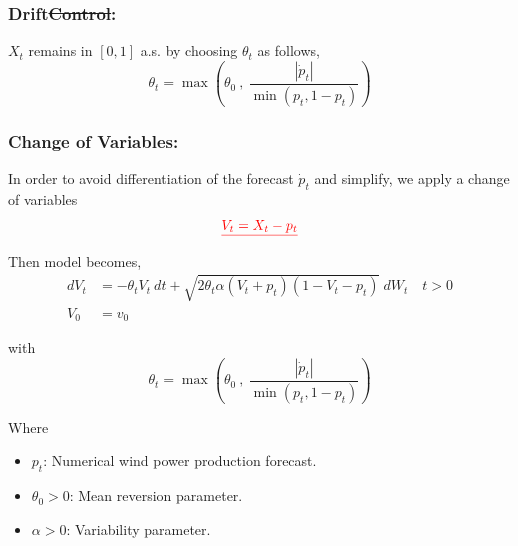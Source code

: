 \documentclass[ima, 20pt, portrait, plainboxedsections]{sciposter}
\providecommand{\DIFadd}[1]{{\protect\color{blue}\uwave{#1}}} %
\providecommand{\DIFdel}[1]{{\protect\color{red}\sout{#1}}}                      %
\providecommand{\DIFaddbegin}{} %
\providecommand{\DIFaddend}{} %
\providecommand{\DIFdelbegin}{} %
\providecommand{\DIFdelend}{} %
\begin{document}
\begin{multicols}{3}
\subsubsection*{Drift\DIFdelbegin \DIFdel{Control}\DIFdelend : }
$X_t$ remains in $[0,1]$ a.s. by choosing $\theta_t$ as follows,
\begin{equation}
\theta_t = \max \left( \theta_0 \ , \ \frac{|\dot{p}_t|}{\min (p_t, 1-p_t)}  \right )
\end{equation}

\subsubsection*{Change of Variables:}
In order to avoid differentiation of the forecast $\dot{p}_t$ and simplify, we apply a change of variables \DIFdelbegin \begin{displaymath}\DIFdel{V_t = X_t - p_t}\end{displaymath}  %
\DIFdelend \DIFaddbegin \DIFadd{$V_t = X_t - p_t$. }\DIFaddend Then  model becomes,
\begin{equation}
\DIFdelbegin %
\DIFdelend \DIFaddbegin \begin{split}
dV_t &=  - \theta_t V_t \  dt + \sqrt{2 \theta_t \alpha (V_t +p_t ) (1-V_t-p_t)} \  dW_t \quad t > 0 \\
V_0 & = v_0
\end{split}\DIFaddend \label{main}
\end{equation}


with
\begin{equation}
\theta_t = \max \left( \theta_0 \ , \ \frac{|\dot{p}_t|}{\min (p_t, 1-p_t)}  \right )
\end{equation}

Where
 \begin{itemize} 
\item $p_t$: Numerical wind power production forecast.
\item $\theta_0 >0$: Mean reversion parameter.
\item $\alpha>0$: Variability parameter.
 \end{itemize} 



\end{multicols}
\end{document}
